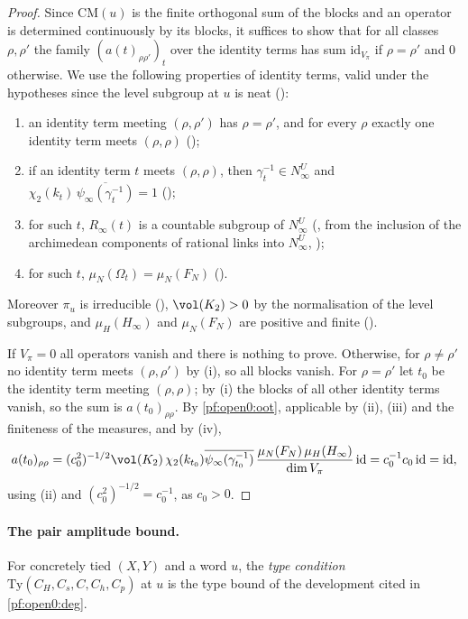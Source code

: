\begin{proof}
Since $\mathrm{CM}(u)$ is the finite orthogonal sum of the blocks and an operator is determined continuously by its blocks, it suffices
to show that for all classes $\rho,\rho'$ the family $(a(t)_{\rho\rho'})_t$ over the identity terms has sum $\mathrm{id}_{V_\pi}$ if
$\rho=\rho'$ and $0$ otherwise. We use the
following properties of identity terms, valid under the hypotheses since the level subgroup at $u$ is neat
():
\begin{enumerate}[label=(\roman*)]
\item an identity term meeting $(\rho,\rho')$ has $\rho=\rho'$, and for every $\rho$ exactly one identity term meets $(\rho,\rho)$
();
\item if an identity term $t$ meets $(\rho,\rho)$, then $\gamma_t^{-1}\in N^U_\infty$ and $\chi_2(k_t)\,\overline{\psi_\infty(\gamma_t^{-1})}=1$
();
\item for such $t$, $R_\infty(t)$ is a countable subgroup of $N^U_\infty$ (, from the inclusion of
the archimedean components of rational links into $N^U_\infty$, );
\item for such $t$, $\mu_N(\Omega_t)=\mu_N(F_N)$ ().
\end{enumerate}
Moreover $\pi_u$ is irreducible (), $\vol(K_2)>0$ by the normalisation of the level subgroups,
and $\mu_H(H_\infty)$ and $\mu_N(F_N)$ are positive and finite ().

If $V_\pi=0$ all operators vanish and there is nothing to prove. Otherwise, for $\rho\ne\rho'$ no identity term meets $(\rho,\rho')$ by
(i), so all blocks vanish. For $\rho=\rho'$ let $t_0$ be the identity term meeting $(\rho,\rho)$; by (i) the blocks of all other
identity terms vanish, so the sum is $a(t_0)_{\rho\rho}$. By \cref{pf:open0:oot}, applicable by (ii), (iii) and the finiteness of the
measures, and by (iv),
\[
a(t_0)_{\rho\rho}=(c_0^2)^{-1/2}\vol(K_2)\,\chi_2(k_{t_0})\overline{\psi_\infty(\gamma_{t_0}^{-1})}\,
\frac{\mu_N(F_N)\,\mu_H(H_\infty)}{\dim V_\pi}\,\mathrm{id}=c_0^{-1}c_0\,\mathrm{id}=\mathrm{id},
\]
using (ii) and $(c_0^2)^{-1/2}=c_0^{-1}$, as $c_0>0$.
\end{proof}

\paragraph{The pair amplitude bound.}
For concretely tied $(X,Y)$ and a word $u$, the \emph{type condition} $\mathrm{Ty}(C_H,C_s,C,C_h,C_p)$ at $u$ is the type bound of the
development cited in \cref{pf:open0:deg}.

